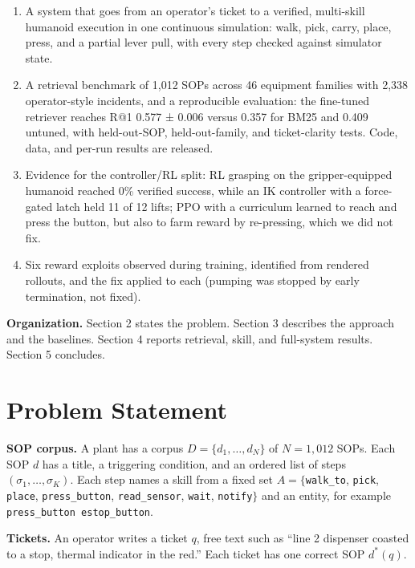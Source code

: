 \documentclass[
  10pt,
  twocolumn]{article}
\providecommand{\tightlist}{%
  \setlength{\itemsep}{0pt}\setlength{\parskip}{0pt}}
\begin{document}
\begin{enumerate}
\def\labelenumi{\arabic{enumi}.}
\tightlist
\item
  A system that goes from an operator's ticket to a verified,
  multi-skill humanoid execution in one continuous simulation: walk,
  pick, carry, place, press, and a partial lever pull, with every step
  checked against simulator state.
\item
  A retrieval benchmark of 1,012 SOPs across 46 equipment families with
  2,338 operator-style incidents, and a reproducible evaluation: the
  fine-tuned retriever reaches R@1 0.577 ± 0.006 versus 0.357 for BM25
  and 0.409 untuned, with held-out-SOP, held-out-family, and
  ticket-clarity tests. Code, data, and per-run results are released.
\item
  Evidence for the controller/RL split: RL grasping on the
  gripper-equipped humanoid reached 0\% verified success, while an IK
  controller with a force-gated latch held 11 of 12 lifts; PPO with a
  curriculum learned to reach and press the button, but also to farm
  reward by re-pressing, which we did not fix.
\item
  Six reward exploits observed during training, identified from rendered
  rollouts, and the fix applied to each (pumping was stopped by early
  termination, not fixed).
\end{enumerate}

\textbf{Organization.} Section 2 states the problem. Section 3 describes
the approach and the baselines. Section 4 reports retrieval, skill, and
full-system results. Section 5 concludes.

\section{Problem Statement}\label{problem-statement}

\textbf{SOP corpus.} A plant has a corpus \(D = \{d_1, \dots, d_N\}\) of
\(N = 1{,}012\) SOPs. Each SOP \(d\) has a title, a triggering
condition, and an ordered list of steps \((\sigma_1, \dots, \sigma_K)\).
Each step names a skill from a fixed set \(A = \{\)\texttt{walk\_to},
\texttt{pick}, \texttt{place}, \texttt{press\_button},
\texttt{read\_sensor}, \texttt{wait}, \texttt{notify}\(\}\) and an
entity, for example \texttt{press\_button\ estop\_button}.

\textbf{Tickets.} An operator writes a ticket \(q\), free text such as
``line 2 dispenser coasted to a stop, thermal indicator in the red.''
Each ticket has one correct SOP \(d^*(q)\).
\end{document}
